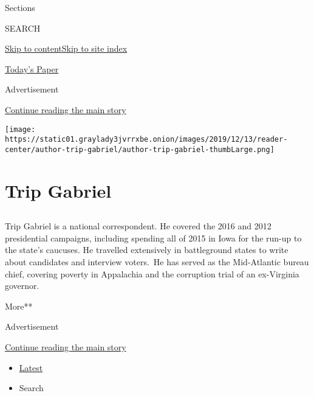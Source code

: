 Sections

SEARCH

\protect\hyperlink{site-content}{Skip to
content}\protect\hyperlink{site-index}{Skip to site index}

\href{https://myaccount.nytimes3xbfgragh.onion/auth/login?response_type=cookie\&client_id=vi}{}

\href{https://www.nytimes3xbfgragh.onion/section/todayspaper}{Today's
Paper}

Advertisement

\protect\hyperlink{after-top}{Continue reading the main story}

\texttt{[image: https://static01.graylady3jvrrxbe.onion/images/2019/12/13/reader-center/author-trip-gabriel/author-trip-gabriel-thumbLarge.png]}

\hypertarget{trip-gabriel}{%
\section{Trip Gabriel}\label{trip-gabriel}}

\subsection{}

Trip Gabriel is a national correspondent. He covered the 2016 and 2012
presidential campaigns, including spending all of 2015 in Iowa for the
run-up to the state's caucuses. He travelled extensively in battleground
states to write about candidates and interview voters.~He has served as
the Mid-Atlantic bureau chief, covering poverty in Appalachia and the
corruption trial of an ex-Virginia governor.

More**

Advertisement

\protect\hyperlink{after-mid1}{Continue reading the main story}

\begin{itemize}
\tightlist
\item
  \protect\hyperlink{stream-panel}{Latest}
\item
  Search
\end{itemize}

